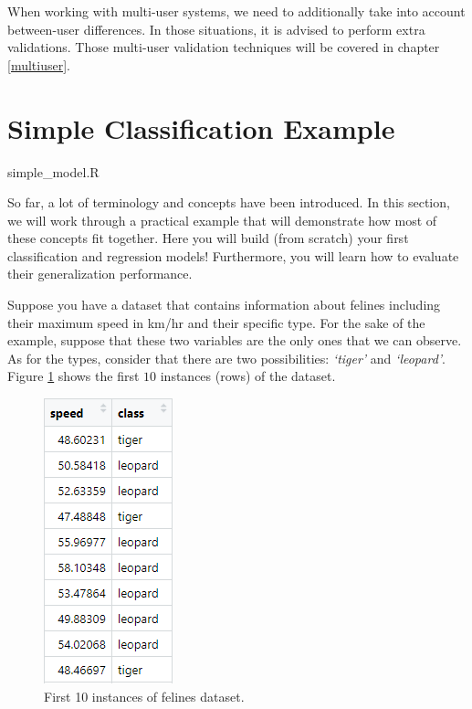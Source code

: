 \documentclass[
  11pt,
]{krantz}
\makeatletter
\newenvironment{kframe}{%
\medskip{}
\setlength{\fboxsep}{.8em}
 \def\at@end@of@kframe{}%
 \ifinner\ifhmode%
  \def\at@end@of@kframe{\end{minipage}}%
  \begin{minipage}{\columnwidth}%
 \fi\fi%
 \def\FrameCommand##1{\hskip\@totalleftmargin \hskip-\fboxsep
 \colorbox{shadecolor}{##1}\hskip-\fboxsep
     \hskip-\linewidth \hskip-\@totalleftmargin \hskip\columnwidth}%
 \MakeFramed {\advance\hsize-\width
   \@totalleftmargin\z@ \linewidth\hsize
   \@setminipage}}%
 {\par\unskip\endMakeFramed%
 \at@end@of@kframe}
\newenvironment{rmdblock}[1]
  {
  \begin{itemize}
  \renewcommand{\labelitemi}{
    \raisebox{-.7\height}[0pt][0pt]{
      {\setkeys{Gin}{width=3em,keepaspectratio}\texttt{[image: images/icons/\#1]}}
    }
  }
  \setlength{\fboxsep}{1em}
  \begin{kframe}
  \item
  }
  {
  \end{kframe}
  \end{itemize}
  }
\newenvironment{rmdinfo}
  {\begin{rmdblock}{info}}
  {\end{rmdblock}}
\newenvironment{rmdfolder}
  {\begin{rmdblock}{folder}}
  {\end{rmdblock}}
\makeatother
\begin{document}
\begin{rmdinfo}
When working with multi-user systems, we need to additionally take into account between-user differences. In those situations, it is advised to perform extra validations. Those multi-user validation techniques will be covered in chapter \ref{multiuser}.
\end{rmdinfo}

\hypertarget{simple-classification-example}{%
\section{Simple Classification Example}\label{simple-classification-example}}

\begin{rmdfolder}
simple\_model.R
\end{rmdfolder}

So far, a lot of terminology and concepts have been introduced. In this section, we will work through a practical example that will demonstrate how most of these concepts fit together. Here you will build (from scratch) your first classification and regression models! Furthermore, you will learn how to evaluate their generalization performance.

Suppose you have a dataset that contains information about felines including their maximum speed in km/hr and their specific type. For the sake of the example, suppose that these two variables are the only ones that we can observe. As for the types, consider that there are two possibilities: \emph{`tiger'} and \emph{`leopard'}. Figure \ref{fig:felinesTable} shows the first \(10\) instances (rows) of the dataset.

\begin{figure}

{\centering \includegraphics[width=0.25\linewidth]{images/felines_table} 

}

\caption{First 10 instances of felines dataset.}\label{fig:felinesTable}
\end{figure}
\end{document}
